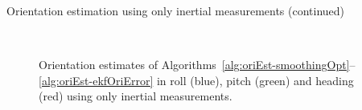 \begin{myexample}{Orientation estimation using only inertial measurements (continued)}
\begin{figure}[t]
	\centering
	 \\
  \caption{Orientation estimates of Algorithms~\ref{alg:oriEst-smoothingOpt}--\ref{alg:oriEst-ekfOriError} in roll (blue), pitch (green) and heading (red) using only inertial measurements.}
  \label{fig:oriEst-noMagDataEstAll}
\end{figure}


\end{myexample}
